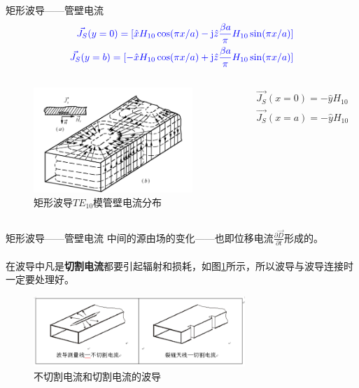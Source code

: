 \begin{frame}{矩形波导——管壁电流}
    \begin{align*}
        \color{blue}{\vec{J_S}(y=0)=[\hat{x}H_{10}\cos(\pi x/a)-\mathrm{j}\hat{z}\frac{\beta a}{\pi}H_{10}\sin(\pi x/a)]} \\
        \color{blue}{\vec{J_S}(y=b)=[-\hat{x}H_{10}\cos(\pi x/a)+\mathrm{j}\hat{z}\frac{\beta a}{\pi}H_{10}\sin(\pi x/a)]}
    \end{align*}
    \begin{columns}
        \begin{column}{0.5\linewidth}
            \begin{figure}
                \includegraphics[width=6cm]{Cha6//fig6-6.png}
                \caption{矩形波导$TE_{10}$模管壁电流分布}
            \end{figure}
        \end{column}
        \begin{column}{0.5\linewidth}
            \begin{align*}
                \vec{J_S}(x=0)=-\hat{y}H_{10} \\
                \vec{J_S}(x=a)=-\hat{y}H_{10}
            \end{align*}
        \end{column}
    \end{columns}
\end{frame}

\begin{frame}{矩形波导——管壁电流}
    中间的源由场的变化——也即位移电流$\frac{\partial\vec{D}}{\partial t}$形成的。\\
    \hspace*{\fill}\\
    在波导中凡是\textbf{切割电流}都要引起辐射和损耗，如图\ref{fig6-7png}所示，所以波导与波导连接时一定要处理好。
    \begin{figure}
        \includegraphics[width=8cm]{Cha6//fig6-7.png}
        \caption{不切割电流和切割电流的波导}
        \label{fig6-7png}
    \end{figure}
\end{frame}


